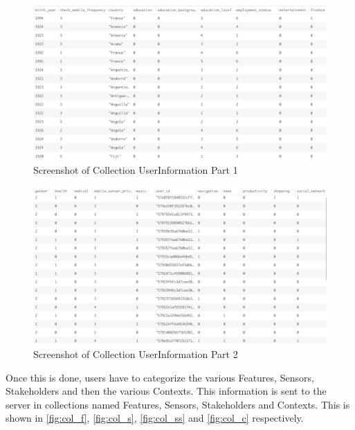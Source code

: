 \begin{figure}[ht!]
\centering
\includegraphics[width=\textwidth,keepaspectratio,height=0.6\textwidth]{./images/collection_ui_1}
\caption{Screenshot of Collection UserInformation Part 1}
\label{fig:col_ui_1}
\end{figure}

\begin{figure}[ht!]
\centering
\includegraphics[width=\textwidth,keepaspectratio,height=0.6\textwidth]{./images/collection_ui_2}
\caption{Screenshot of Collection UserInformation Part 2}
\label{fig:col_ui_2}
\end{figure}

Once this is done, users have to categorize the various Features, Sensors, Stakeholders and then the various Contexts. This information is sent to the server in collections named Features, Sensors, Stakeholders and Contexts. This is shown in \ref{fig:col_f}, \ref{fig:col_s}, \ref{fig:col_ss} and \ref{fig:col_c} respectively.

